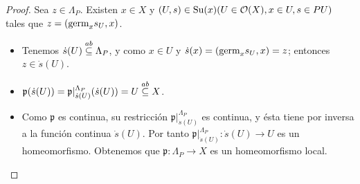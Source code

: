 \begin{proof}
   Sea $z\in\Lambda_P$. Existen $x\in X$ y $(U,s)\in\normalfont{\text{Su}}(x) (U\in\mathcal{O}(X),x\in U,s\in PU)$ tales que $z=(\normalfont{\text{germ}}_{x}s_{U},x)$.
   \begin{itemize}
      \item Tenemos $\dot{s}(U)\stackrel{ab}{\subseteq} \Lambda_P$, y como $x\in U$ y $\dot{s}(x)=(\normalfont{\text{germ}}_{x}s_{U},x)=z$; entonces $z\in\dot{s}(U)$.
      \item $\mathfrak{p}(\dot{s}(U))=\mathfrak{p}|^{\Lambda_P}_{\dot{s}(U)}(\dot{s}(U))=U\stackrel{ab}{\subseteq} X$.
      \item Como $\mathfrak{p}$ es continua, su restricción $\mathfrak{p}|^{\Lambda_P}_{\dot{s}(U)}$ es continua, y ésta tiene por inversa a la función continua $\dot{s}(U)$. Por tanto $\mathfrak{p}|^{\Lambda_P}_{\dot{s}(U)}:\dot{s}(U)\to U$ es un homeomorfismo.
      Obtenemos que $\mathfrak{p}:\Lambda_P\to X$ es un homeomorfismo local.
   \end{itemize}
\end{proof}
